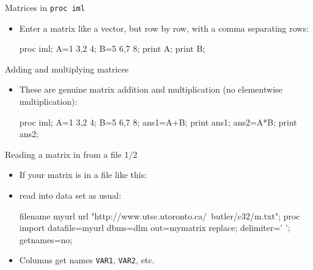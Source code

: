\documentclass[unknownkeysallowed]{beamer}\usepackage[]{graphicx}\usepackage[]{color}
\begin{document}
\begin{frame}[fragile]{Matrices in \texttt{proc iml}}
  
  \begin{itemize}
  \item Enter a matrix like a vector, but row by row, with a comma
    separating rows:
    
    \begin{Sascode}[store=imea]
proc iml;
  A={1 3,2 4};
  B={5 6,7 8};
  print A;
  print B;
    \end{Sascode}
    
  \end{itemize}
  
\end{frame}

\begin{frame}[fragile]{Adding and multiplying matrices}
  
  \begin{itemize}
  \item These are genuine matrix addition and multiplication (no
    elementwise multiplication):
    
    \begin{Sascode}[store=ime]
proc iml;
  A={1 3,2 4};
  B={5 6,7 8};
  ans1=A+B; 
  print ans1;
  ans2=A*B;
  print ans2;
    \end{Sascode}
    
    
  \end{itemize}
  
\end{frame}

\begin{frame}[fragile]{Reading a matrix in from a file 1/2}
  
  \begin{itemize}
  \item If your matrix is in a file like this:
    

\item read into data set as usual:
  
    \begin{Datastep}
filename myurl url 
  "http://www.utsc.utoronto.ca/~butler/c32/m.txt";
proc import
  datafile=myurl
    dbms=dlm
    out=mymatrix
    replace;
  delimiter=' ';
  getnames=no; 
    \end{Datastep}
    
  \item Columns get names \texttt{VAR1}, \texttt{VAR2}, etc.
    
  \end{itemize}
  
\end{frame}
\end{document}
